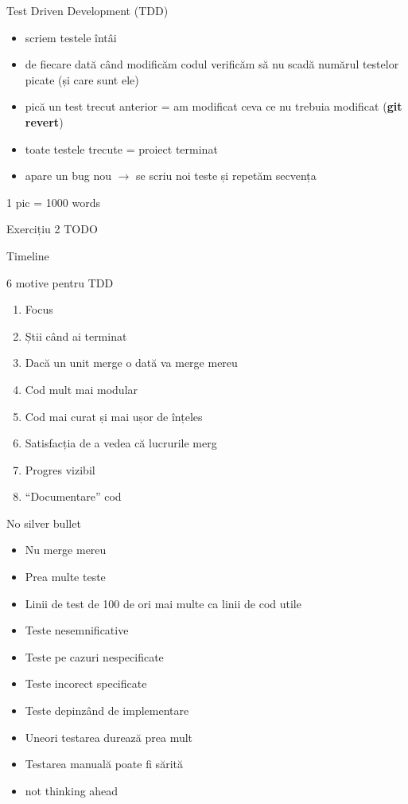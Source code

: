\documentclass{beamer}
\begin{document}
\begin{frame}{Test Driven Development (TDD)}
  \begin{itemize}[<+->]
    \item scriem testele întâi
    \item de fiecare dată când modificăm codul verificăm să nu scadă numărul
    testelor picate (și care sunt ele)
    \item pică un test trecut anterior = am modificat ceva ce nu trebuia
    modificat (\textbf{git revert})
    \item toate testele trecute = proiect terminat
    \item apare un bug nou $\rightarrow$ se scriu noi teste și repetăm
    secvența
  \end{itemize}
\end{frame}

\begin{frame}{1 pic = 1000 words}
\end{frame}

\begin{frame}{Exercițiu 2}
  TODO
\end{frame}

\begin{frame}{Timeline}
\end{frame}

\begin{frame}{6 motive pentru TDD}
  \begin{enumerate}[<+->]
    \item Focus
    \item Știi când ai terminat
    \item Dacă un unit merge o dată va merge mereu
    \item Cod mult mai modular
    \item Cod mai curat și mai ușor de înțeles
    \item Satisfacția de a vedea că lucrurile merg
    \item Progres vizibil
    \item ``Documentare'' cod
  \end{enumerate}
\end{frame}

\begin{frame}{No silver bullet}
  \begin{itemize}[<+->]
    \item Nu merge mereu
    \item Prea multe teste
    \item Linii de test de 100 de ori mai multe ca linii de cod utile
    \item Teste nesemnificative
    \item Teste pe cazuri nespecificate
    \item Teste incorect specificate
    \item Teste depinzând de implementare
    \item Uneori testarea durează prea mult
    \item Testarea manuală poate fi sărită
    \item not thinking ahead
  \end{itemize}
\end{frame}
\end{document}
